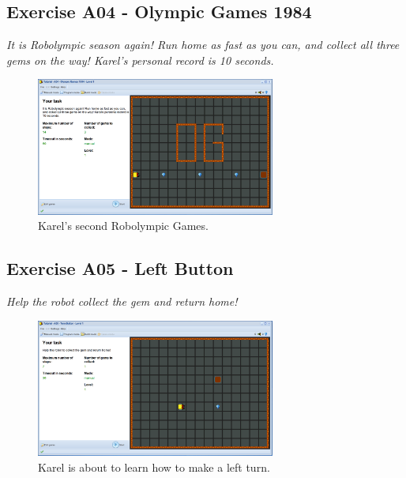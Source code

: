 \documentclass[article,A4,12pt]{llncs}
\begin{document}
\newpage
\subsection{Exercise A04 - Olympic Games 1984}

{\em It is Robolympic season again! Run home as fast as you can, 
and collect all three gems on the way! Karel's personal record is 10 seconds.}


\begin{figure}[!ht]
\begin{center}
\includegraphics[width=0.7\textwidth]{img/a04.png}
\end{center}
\vspace{-4mm}
\caption{Karel's second Robolympic Games.}
\label{fig:a04}
\vspace{-1cm}
\end{figure}
\noindent


\subsection{Exercise A05 - Left Button}

{\em Help the robot collect the gem and return home!}

\begin{figure}[!ht]
\begin{center}
\includegraphics[width=0.7\textwidth]{img/a05.png}
\end{center}
\vspace{-4mm}
\caption{Karel is about to learn how to make a left turn.}
\label{fig:a05}
\vspace{-1cm}
\end{figure}
\noindent
\end{document}

